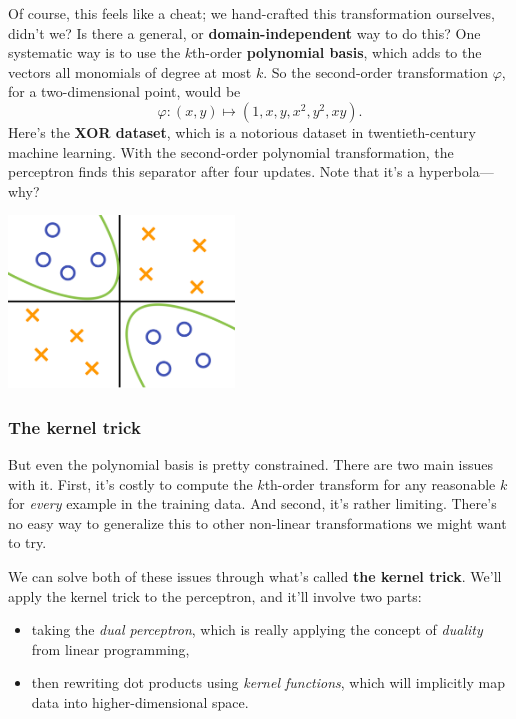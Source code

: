 \documentclass[11pt,paper=letter]{scrartcl}
\begin{document}
Of course, this feels like a cheat; we hand-crafted this transformation ourselves, didn't we? Is there a general, or \textbf{domain-independent} way to do this? One systematic way is to use the $k$th-order \textbf{polynomial basis}, which adds to the vectors all monomials of degree at most $k$. So the second-order transformation $\varphi$, for a two-dimensional point, would be \[
  \varphi: (x, y) \mapsto (1, x, y, x^2, y^2, xy).
\]
Here's the \textbf{XOR dataset}, which is a notorious dataset in twentieth-century machine learning. With the second-order polynomial transformation, the perceptron finds this separator after four updates. Note that it's a hyperbola---why?
\begin{center}
  \includegraphics[height=1.8in]{14.png}
\end{center}

\subsubsection*{The kernel trick}

But even the polynomial basis is pretty constrained. There are two main issues with it. First, it's costly to compute the $k$th-order transform for any reasonable $k$ for \textit{every} example in the training data. And second, it's rather limiting. There's no easy way to generalize this to other non-linear transformations we might want to try.

We can solve both of these issues through what's called \textbf{the kernel trick}. We'll apply the kernel trick to the perceptron, and it'll involve two parts:
\begin{itemize}
  \item taking the \textit{dual perceptron}, which is really applying the concept of \textit{duality} from linear programming,
  \item then rewriting dot products using \textit{kernel functions}, which will implicitly map data into higher-dimensional space.
\end{itemize}
\end{document}
